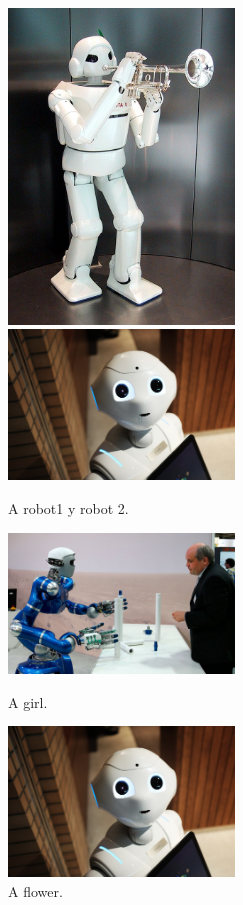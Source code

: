 \documentclass{article}
\begin{document}
    \blindtext[10]
    \begin{figure}[t]
        \centering
        \includegraphics[width=6.0cm]{robot1.jpg}
        \includegraphics[width=6.0cm]{robot2.jpeg}
        \caption{A robot1 y robot 2.}
        \label{robots pegados}
    \end{figure}

\blindtext[10]
    \begin{figure}[b]
        \begin{minipage}[c]{.6\linewidth}
            \centering
            \includegraphics[width=6.0cm]{robot4.jpg}
            \caption{A girl.}
            \label{girl}
        \end{minipage}\hfill
%
        \begin{minipage}[c]{.6\linewidth}
            \centering
            \includegraphics[width=6cm]{robot2.jpeg}
            \caption{A flower.}
            \label{flower}
        \end{minipage}
       
    \end{figure}
\blindtext[10]
\end{document}
